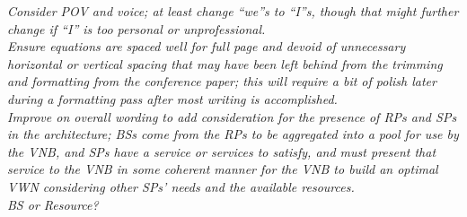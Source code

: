 \documentclass[12pt,dvipsnames]{report}
\begin{document}
%
\textit{Consider POV and voice; at least change ``we''s to ``I''s, though that might further change if ``I'' is too personal or unprofessional.\\Ensure equations are spaced well for full page and devoid of unnecessary horizontal or vertical spacing that may have been left behind from the trimming and formatting from the conference paper; this will require a bit of polish later during a formatting pass after most writing is accomplished.\\Improve on overall wording to add consideration for the presence of RPs and SPs in the architecture; BSs come from the RPs to be aggregated into a pool for use by the VNB, and SPs have a service or services to satisfy, and must present that service to the VNB in some coherent manner for the VNB to build an optimal VWN considering other SPs' needs and the available resources.\\BS or Resource?}
\end{document}
